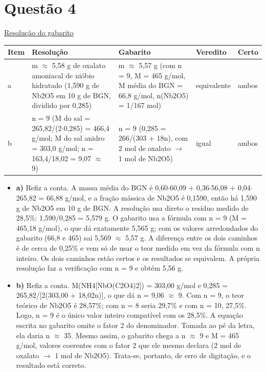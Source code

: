 \documentclass{article}%
\begin{document}
\section*{Questão 4}%
\href{https://poliedroresolve.sistemapoliedro.com.br/vestibulares/ita/2026/ita-2-fase-dia-2-29-10-2025-2-fase-dia-2/dissertativa-4-quimica-2-fase-dia-2-ita-2026}{Resolução do gabarito}\par\smallskip%
\begin{longtable}{@{}p{} p{} p{} p{} p{}@{}}\toprule Item & Resolução & Gabarito & Veredito & Certo \\ \midrule
a & m $\approx$ 5,58 g de oxalato amoniacal de nióbio hidratado (1,590 g de Nb2O5 em 10 g de BGN, dividido por 0,285) & m $\approx$ 5,57 g (com n = 9, M = 465 g/mol, M média do BGN = 66,8 g/mol, n(Nb2O5) = 1/167 mol) & equivalente & ambos \\
b & n = 9 (M do sal = 265,82/(2$\cdot$0,285) = 466,4 g/mol; M do sal anidro = 303,0 g/mol; n = 163,4/18,02 = 9,07 $\approx$ 9) & n = 9 (0,285 = 266/(303 + 18n), com 2 mol de oxalato $\to$ 1 mol de Nb2O5) & igual & ambos \\
\bottomrule\end{longtable}%
\begin{itemize}%
\item%
\textbf{a)} Refiz a conta. A massa média do BGN é 0,60$\cdot$60,09 + 0,36$\cdot$56,08 + 0,04$\cdot$265,82 = 66,88 g/mol, e a fração mássica de Nb2O5 é 0,1590, então há 1,590 g de Nb2O5 em 10 g de BGN. A resolução usa direto o resíduo medido de 28,5\%: 1,590/0,285 = 5,579 g. O gabarito usa a fórmula com n = 9 (M = 465,18 g/mol), o que dá exatamente 5,565 g; com os valores arredondados do gabarito (66,8 e 465) sai 5,569 $\approx$ 5,57 g. A diferença entre os dois caminhos é de cerca de 0,25\% e vem só de usar o teor medido em vez da fórmula com n inteiro. Os dois caminhos estão certos e os resultados se equivalem. A própria resolução faz a verificação com n = 9 e obtém 5,56 g.%
\item%
\textbf{b)} Refiz a conta. M(NH4{[}NbO(C2O4)2{]}) = 303,00 g/mol e 0,285 = 265,82/{[}2(303,00 + 18,02n){]}, o que dá n = 9,06 $\approx$ 9. Com n = 9, o teor teórico de Nb2O5 é 28,57\%; com n = 8 seria 29,7\% e com n = 10, 27,5\%. Logo, n = 9 é o único valor inteiro compatível com os 28,5\%. A equação escrita no gabarito omite o fator 2 do denominador. Tomada ao pé da letra, ela daria n $\approx$ 35. Mesmo assim, o gabarito chega a n $\approx$ 9 e M = 465 g/mol, valores coerentes com o fator 2 que ele mesmo declara (2 mol de oxalato $\to$ 1 mol de Nb2O5). Trata{-}se, portanto, de erro de digitação, e o resultado está correto.%
\end{itemize}%
\end{document}
